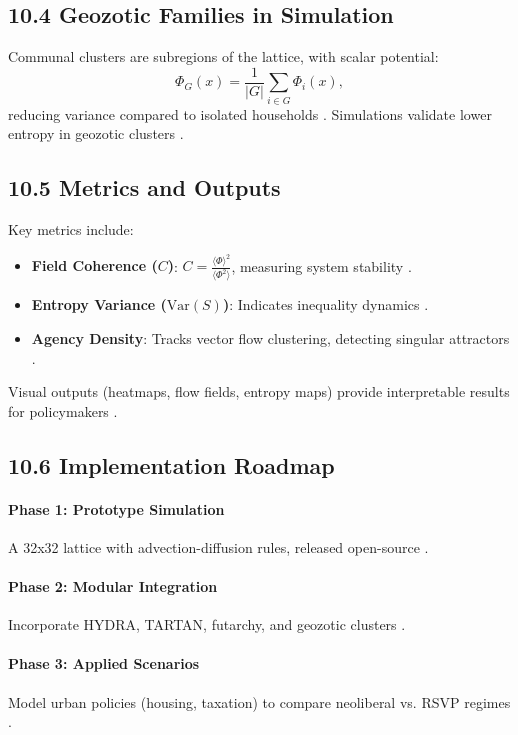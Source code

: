 \documentclass[12pt]{article}
\begin{document}
{{\subsection*{10.4 Geozotic Families in Simulation}

Communal clusters are subregions of the lattice, with scalar potential:
\[
\Phi_G(x) = \frac{1}{|G|} \sum_{i \in G} \Phi_i(x),
\]
reducing variance compared to isolated households \citep{cover2006}. Simulations validate lower entropy in geozotic clusters \citep{deleuze1987}.

\subsection*{10.5 Metrics and Outputs}

Key metrics include:
\begin{itemize}
    \item \textbf{Field Coherence (\(C\))}: \(C = \frac{\langle \Phi \rangle^2}{\langle \Phi^2 \rangle}\), measuring system stability \citep{gromov1999}.
    \item \textbf{Entropy Variance (\(\mathrm{Var}(S)\))}: Indicates inequality dynamics \citep{shannon1948}.
    \item \textbf{Agency Density}: Tracks vector flow clustering, detecting singular attractors \citep{pearl2009}.
\end{itemize}
Visual outputs (heatmaps, flow fields, entropy maps) provide interpretable results for policymakers \citep{milewski2018}.

\subsection*{10.6 Implementation Roadmap}

\paragraph{Phase 1: Prototype Simulation}
A 32x32 lattice with advection-diffusion rules, released open-source \citep{bird1988}.

\paragraph{Phase 2: Modular Integration}
Incorporate HYDRA, TARTAN, futarchy, and geozotic clusters \citep{milewski2018}.

\paragraph{Phase 3: Applied Scenarios}
Model urban policies (housing, taxation) to compare neoliberal vs. RSVP regimes \citep{zuboff2019}.

}}
\end{document}
